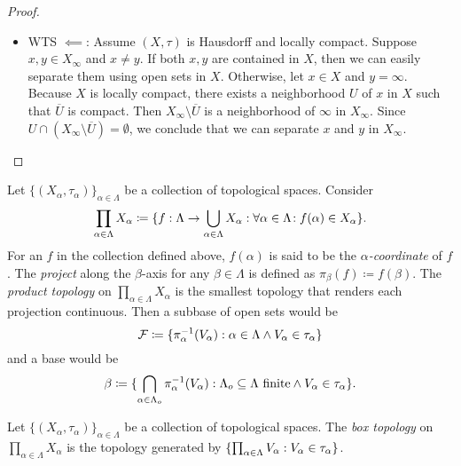 \documentclass[screen,single]{techreport}
\numberwithin{equation}{section}
\begin{document}
\begin{proof}
\begin{enumerate}
\begin{itemize}
			\item WTS $\impliedby$: Assume $(X,\tau)$ is Hausdorff and locally compact.
			Suppose $x,y \in X_\infty$ and $x \neq y$.
			If both $x,y$ are contained in $X$, then we can easily separate them using open sets in $X$.
			Otherwise, let $x \in X$ and $y = \infty$.
			Because $X$ is locally compact, there exists a neighborhood $U$ of $x$ in $X$ such that $\overline{U}$ is compact.
			Then $X_\infty \setminus \overline{U}$ is a neighborhood of $\infty$ in $X_\infty$.
			Since $U \cap (X_\infty \setminus \overline{U}) = \emptyset$, we conclude that we can separate $x$ and $y$ in $X_\infty$.
		\end{itemize}
	\end{enumerate}
\end{proof}

\begin{definition}\label{De:GeneralProductTopology}
	Let $\{(X_\alpha,\tau_\alpha)\}_{\alpha \in \Lambda}$ be a collection of topological spaces.
	Consider
	\[
	\prod_{\alpha \in \Lambda} X_\alpha \coloneqq \{ { f : \Lambda \to \bigcup_{\alpha \in \Lambda} X_\alpha : \forall {\alpha \in \Lambda}\!: f(\alpha) \in X_\alpha } \}.
	\]
	For an $f$ in the collection defined above, $f(\alpha)$ is said to be the \emph{$\alpha$-coordinate} of $f$.
	The \emph{project} along the $\beta$-axis for any $\beta \in \Lambda$ is defined as $\pi_\beta(f) \coloneqq f(\beta)$.
	The \emph{product topology} on $\prod_{\alpha \in \Lambda} X_\alpha$ is the smallest topology that renders each projection continuous.
	Then a subbase of open sets would be
	\[
	\mathcal{F} \coloneqq \{ { \pi_\alpha^{-1}(V_\alpha) : \alpha \in \Lambda \wedge V_\alpha \in \tau_\alpha } \}
	\]
	and a base would be
	\[
	\beta \coloneqq \{ { \bigcap_{\alpha \in \Lambda_o} \pi_\alpha^{-1}(V_\alpha) : \Lambda_o \subseteq \Lambda~\mathrm{finite} \wedge V_\alpha \in \tau_\alpha  } \}.
	\]
\end{definition}

\begin{definition}\label{De:BoxTopology}
	Let $\{(X_\alpha,\tau_\alpha)\}_{\alpha \in \Lambda}$ be a collection of topological spaces.
	The \emph{box topology} on $\prod_{\alpha \in \Lambda} X_\alpha$ is the topology generated by $\{ { \prod_{\alpha \in \Lambda} V_\alpha : V_\alpha \in \tau_\alpha } \}$.
\end{definition}
\end{document}
